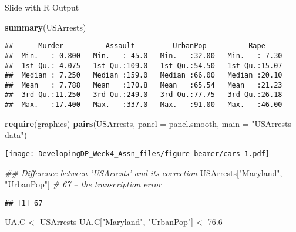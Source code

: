 \documentclass[
  ignorenonframetext,
]{beamer}
\newenvironment{Shaded}{\begin{snugshade}}{\end{snugshade}}
\newcommand{\CommentTok}[1]{\textcolor[rgb]{0.56,0.35,0.01}{\textit{#1}}}
\newcommand{\DataTypeTok}[1]{\textcolor[rgb]{0.13,0.29,0.53}{#1}}
\newcommand{\FloatTok}[1]{\textcolor[rgb]{0.00,0.00,0.81}{#1}}
\newcommand{\KeywordTok}[1]{\textcolor[rgb]{0.13,0.29,0.53}{\textbf{#1}}}
\newcommand{\NormalTok}[1]{#1}
\newcommand{\StringTok}[1]{\textcolor[rgb]{0.31,0.60,0.02}{#1}}
\begin{document}
\begin{frame}[fragile]{Slide with R Output}
\protect\hypertarget{slide-with-r-output}{}

\begin{Shaded}
\begin{Highlighting}[]
\KeywordTok{summary}\NormalTok{(USArrests)}
\end{Highlighting}
\end{Shaded}

\begin{verbatim}
##      Murder          Assault         UrbanPop          Rape      
##  Min.   : 0.800   Min.   : 45.0   Min.   :32.00   Min.   : 7.30  
##  1st Qu.: 4.075   1st Qu.:109.0   1st Qu.:54.50   1st Qu.:15.07  
##  Median : 7.250   Median :159.0   Median :66.00   Median :20.10  
##  Mean   : 7.788   Mean   :170.8   Mean   :65.54   Mean   :21.23  
##  3rd Qu.:11.250   3rd Qu.:249.0   3rd Qu.:77.75   3rd Qu.:26.18  
##  Max.   :17.400   Max.   :337.0   Max.   :91.00   Max.   :46.00
\end{verbatim}

\begin{Shaded}
\begin{Highlighting}[]
\KeywordTok{require}\NormalTok{(graphics)}
\KeywordTok{pairs}\NormalTok{(USArrests, }\DataTypeTok{panel =}\NormalTok{ panel.smooth, }\DataTypeTok{main =} \StringTok{"USArrests data"}\NormalTok{)}
\end{Highlighting}
\end{Shaded}

\texttt{[image: DevelopingDP\_Week4\_Assn\_files/figure-beamer/cars-1.pdf]}

\begin{Shaded}
\begin{Highlighting}[]
\CommentTok{## Difference between 'USArrests' and its correction}
\NormalTok{USArrests[}\StringTok{"Maryland"}\NormalTok{, }\StringTok{"UrbanPop"}\NormalTok{] }\CommentTok{# 67 -- the transcription error}
\end{Highlighting}
\end{Shaded}

\begin{verbatim}
## [1] 67
\end{verbatim}

\begin{Shaded}
\begin{Highlighting}[]
\NormalTok{UA.C <-}\StringTok{ }\NormalTok{USArrests}
\NormalTok{UA.C[}\StringTok{"Maryland"}\NormalTok{, }\StringTok{"UrbanPop"}\NormalTok{] <-}\StringTok{ }\FloatTok{76.6}


\end{Highlighting}
\end{Shaded}
\end{frame}
\end{document}
